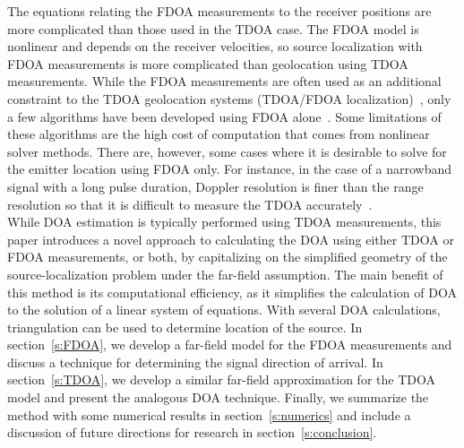 The equations relating the FDOA measurements to the receiver positions are more complicated than those used in the TDOA case. The FDOA model is nonlinear and depends on the receiver velocities, so source localization with FDOA measurements is more complicated than geolocation using TDOA measurements. While the FDOA measurements are often used as an additional constraint to the TDOA geolocation systems (TDOA/FDOA localization)~\cite{Ho1997}, only a few algorithms have been developed using FDOA alone~\cite{Cameron,Jinzhou2012}. Some limitations of these algorithms are the high cost of computation that comes from nonlinear solver methods. There are, however, some cases where it is desirable to solve for the emitter location using FDOA only. For instance, in the case of a narrowband signal with a long pulse duration, Doppler resolution is finer than the range resolution so that it is difficult to measure the TDOA accurately~\cite{Cheney2009,Mason2005,Jinzhou2012}. \\

While DOA estimation is typically performed using TDOA measurements, this paper introduces a novel approach to calculating the DOA using either TDOA or FDOA measurements, or both, by capitalizing on the simplified geometry of the source-localization problem under the far-field assumption. The main benefit of this method is its computational efficiency, as it simplifies the calculation of DOA to the solution of a linear system of equations. With several DOA calculations, triangulation can be used to determine location of the source. In section~\ref{s:FDOA}, we develop a far-field model for the FDOA measurements and discuss a technique for determining the signal direction of arrival. In section~\ref{s:TDOA}, we develop a similar far-field approximation for the TDOA model and present the analogous DOA technique. Finally, we summarize the method with some numerical results in section~\ref{s:numerics} and include a discussion of future directions for research in section~\ref{s:conclusion}.
